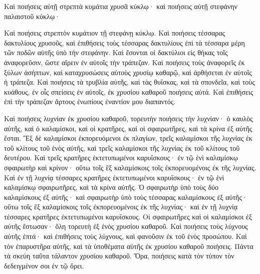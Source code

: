 {Καὶ ποιήσεις αὐτῇ στρεπτὰ κυμάτια χρυσᾶ κύκλῳ· καὶ ποιήσεις αὐτῇ στεφάνην παλαιστοῦ κύκλῳ·
\par }{\PP {}Καὶ ποιήσεις στρεπτὸν κυμάτιον τῇ στεφάνῃ κύκλῳ.
Καὶ ποιήσεις τέσσαρας δακτυλίους χρυσοῦς, καὶ ἐπιθήσεις τοὺς τέσσαρας δακτυλίους ἐπὶ τὰ τέσσαρα μέρη τῶν ποδῶν αὐτῆς ὑπὸ τὴν στεφάνην.
Καὶ ἔσονται οἱ δακτύλιοι εἰς θήκας τοῖς ἀναφορεῦσιν, ὥστε αἴρειν ἐν αὐτοῖς τὴν τράπεζαν.
Καὶ ποιήσεις τοὺς ἀναφορεῖς ἐκ ξύλων ἀσήπτων, καὶ καταχρυσώσεις αὐτοὺς χρυσίῳ καθαρῷ, καὶ ἀρθήσεται ἐν αὐτοῖς ἡ τράπεζα.
Καὶ ποιήσεις τὰ τρυβλία αὐτῆς, καὶ τὰς θυΐσκας, καὶ τὰ σπονδεῖα, καὶ τοὺς κυάθους, ἐν οἷς σπείσεις ἐν αὐτοῖς, ἐκ χρυσίου καθαροῦ ποιήσεις αὐτά.
Καὶ ἐπιθήσεις ἐπὶ τὴν τράπεζαν ἄρτους ἐνωπίους ἐναντίον μου διαπαντός.
\par }{\PP {}Καὶ ποιήσεις λυχνίαν ἐκ χρυσίου καθαροῦ, τορευτὴν ποιήσεις τὴν λυχνίαν· ὁ καυλὸς αὐτῆς, καὶ ὁ καλαμίσκοι, καὶ οἱ κρατῆρες, καὶ οἱ σφαιρωτῆρες, καὶ τὰ κρίνα ἐξ αὐτῆς ἔσται.
Ἓξ δὲ καλαμίσκοι ἐκπορευόμενοι ἐκ πλαγίων, τρεῖς καλαμίσκοι τῆς λυχνίας ἐκ τοῦ κλίτους τοῦ ἑνὸς αὐτῆς, καὶ τρεῖς καλαμίσκοι τῆς λυχνίας ἐκ τοῦ κλίτους τοῦ δευτέρου.
Καὶ τρεῖς κρατῆρες ἐκτετυπωμένοι καρυΐσκους· ἐν τῷ ἑνὶ καλαμίσκῳ σφαιρωτὴρ καὶ κρίνον· οὕτω τοῖς ἓξ καλαμίσκοις τοῖς ἐκπορευομένοις ἐκ τῆς λυχνίας.
Καὶ ἐν τῇ λυχνίᾳ τέσσαρες κρατῆρες ἐκτετυπωμένοι καρυΐσκους· ἐν τῷ ἑνὶ καλαμίσκῳ σφαιρωτῆρες, καὶ τὰ κρίνα αὐτῆς.
Ὁ σφαιρωτὴρ ὑπὸ τοὺς δύο καλαμίσκους ἐξ αὐτῆς· καὶ σφαιρωτὴρ ὑπὸ τοὺς τέσσαρας καλαμίσκους ἐξ αὐτῆς· οὕτω τοῖς ἓξ καλαμίσκοις τοῖς ἐκπορευομένοις ἐκ τῆς λυχνίας· καὶ ἐν τῇ λυχνίᾳ τέσσαρες κρατῆρες ἐκτετυπωμένοι καρυΐσκους.
Οἱ σφαιρωτῆρες καὶ οἱ καλαμίσκοι ἐξ αὐτῆς ἔστωσαν· ὅλη τορευτὴ ἐξ ἑνὸς χρυσίου καθαροῦ.
Καὶ ποιήσεις τοὺς λύχνους αὐτῆς ἑπτά· καὶ ἐπιθήσεις τοὺς λύχνους, καὶ φανοῦσιν ἐκ τοῦ ἑνὸς προσώπου.
Καὶ τὸν ἐπαρυστῆρα αὐτῆς, καὶ τὰ ὑποθέματα αὐτῆς ἐκ χρυσίου καθαροῦ ποιήσεις.
Πάντα τὰ σκεύη ταῦτα τάλαντον χρυσίου καθαροῦ.
Ὅρα, ποιήσεις κατὰ τὸν τύπον τὸν δεδειγμένον σοι ἐν τῷ ὄρει.

}
